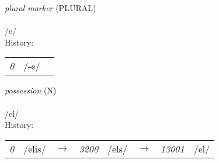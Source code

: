 \vspace{15pt}
\begin{nopagebreak}
 \textit{plural marker} (PLURAL)\\
\\
\noindent /{\textprimstress}e/\\


\noindent History:

\vspace{-0pt}
\hspace{40pt}
\begin{tabular}{ccc}
\textit{0} & /-e/& \\
\end{tabular}

\vspace{20pt}\hline

\end{nopagebreak}
\filbreak



\vspace{15pt}
\begin{nopagebreak}
 \textit{possession} (N)\\
\\
\noindent /{\textprimstress}el/\\


\noindent History:

\vspace{-0pt}
\hspace{40pt}
\begin{tabular}{ccc}
\textit{0} & /elis/&$\rightarrow$ & \textit{3200} & /els/&$\rightarrow$ & \textit{13001} & /el/& \\
\end{tabular}

\vspace{20pt}\hline

\end{nopagebreak}
\filbreak




